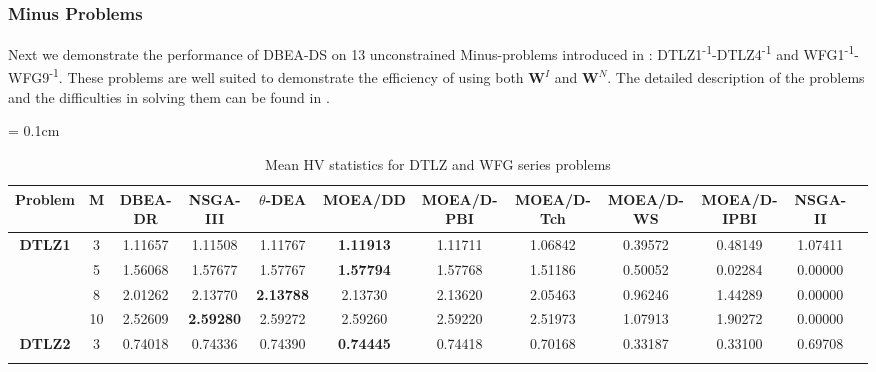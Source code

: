 \documentclass{sig-alternate}
\begin{document}
\subsubsection{Minus Problems}

Next we demonstrate the performance of DBEA-DS on 13 unconstrained Minus-problems introduced in \cite{ishibuchi2016inverse}: DTLZ1\textsuperscript{-1}-DTLZ4\textsuperscript{-1} and WFG1\textsuperscript{-1}-WFG9\textsuperscript{-1}. These problems are well suited to demonstrate the efficiency of using both $\mathbf{W}^I$ and $\mathbf{W}^N$. The detailed description of the problems and the difficulties in solving them can be found in \cite{ishibuchi2016inverse}. 

\begin{table}[!htb]\scriptsize
\centering
\renewcommand{\arraystretch}{0.9}
\caption{Mean HV statistics for DTLZ and WFG series problems}
\label{tab:HV}
\tabcolsep = 0.1cm
\begin{tabular}{|c|c|c|c|c|c|c|c|c|c|c|c|}
\noalign{\smallskip}\hline
\textbf{Problem}                & \textbf{M} & \textbf{DBEA-DR} & \textbf{NSGA-III} & \textbf{$\theta$-DEA} & \textbf{MOEA/DD} & \textbf{MOEA/D-PBI} & \textbf{MOEA/D-Tch} & \textbf{MOEA/D-WS} & \textbf{MOEA/D-IPBI} & \textbf{NSGA-II} \\ \hline
\multirow{4}{*}{\textbf{DTLZ1}} & 3          & 1.11657          & 1.11508           & 1.11767               & \textbf{1.11913} & 1.11711             & 1.06842             & 0.39572            & 0.48149              & 1.07411          \\ \cline{2-11} 
& 5          & 1.56068          & 1.57677           & 1.57767               & \textbf{1.57794} & 1.57768             & 1.51186             & 0.50052            & 0.02284              & 0.00000          \\ \cline{2-11} 
& 8          & 2.01262          & 2.13770           & \textbf{2.13788}      & 2.13730          & 2.13620             & 2.05463             & 0.96246            & 1.44289              & 0.00000          \\ \cline{2-11} 
& 10         & 2.52609          & \textbf{2.59280}  & 2.59272               & 2.59260          & 2.59220             & 2.51973             & 1.07913            & 1.90272              & 0.00000          \\ \hline
\multirow{4}{*}{\textbf{DTLZ2}} & 3          & 0.74018          & 0.74336           & 0.74390               & \textbf{0.74445} & 0.74418             & 0.70168             & 0.33187            & 0.33100              & 0.69708          \\ \cline{2-11} 

\end{tabular}
\end{table}
\end{document}
